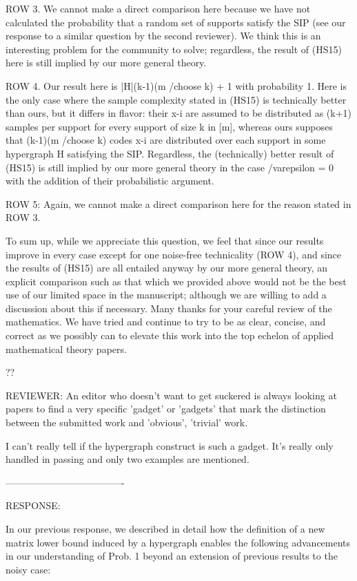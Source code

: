 ROW 3. We cannot make a direct comparison here because we have not calculated the probability that a random set of supports satisfy the SIP (see our response to a similar question by the second reviewer). We think this is an interesting problem for the community to solve; regardless, the result of (HS15) here is still implied by our more general theory.

ROW 4. Our result here is |H|(k-1)(m /choose k) + 1 with probability 1. Here is the only case where the sample complexity stated in (HS15) is technically better than ours, but it differs in flavor: their x-i are assumed to be distributed as (k+1) samples per support for every support of size k in [m], whereas ours supposes that (k-1)(m /choose k) codes x-i are distributed over each support in some hypergraph H satisfying the SIP. Regardless, the (technically) better result of (HS15) is still implied by our more general theory in the case /varepsilon = 0 with the addition of their probabilistic argument.

ROW 5: Again, we cannot make a direct comparison here for the reason stated in ROW 3.

To sum up, while we appreciate this question, we feel that since our results improve in every case except for one noise-free technicality (ROW 4), and since the results of (HS15) are all entailed anyway by our more general theory, an explicit comparison such as that which we provided above would not be the best use of our limited space in the manuscript; although we are willing to add a discussion about this if necessary. Many thanks for your careful review of the mathematics. We have tried and continue to try to be as clear, concise, and correct as we possibly can to elevate this work into the top echelon of applied mathematical theory papers.

??

REVIEWER: An editor who doesn't want to get suckered is always looking at papers
to find a very specific 'gadget' or 'gadgets' that mark the distinction
between the submitted work and 'obvious', 'trivial' work.

I can't really tell if the hypergraph construct is such a gadget. It's
really only handled in passing and only two examples are mentioned.

-------------------------------------

RESPONSE:

In our previous response, we described in detail how the definition of a new matrix lower bound induced by a hypergraph enables the following advancements in our understanding of Prob. 1 beyond an extension of previous results to the noisy case:

